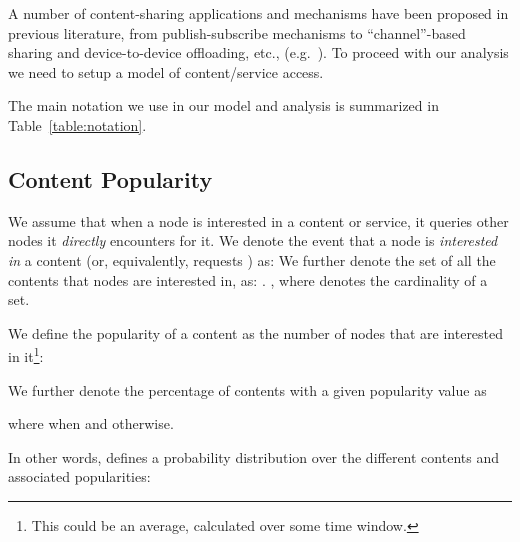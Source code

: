 \documentclass[journal]{IEEEtran}
\begin{document}
A number of content-sharing applications and mechanisms have been proposed in previous literature, from publish-subscribe mechanisms to ``channel''-based sharing and device-to-device offloading, etc., (e.g.~\cite{Yoneki-publish-subscribe-dtn,MobComp-next-decade,Ott-oppnet-applications,podcasting}). To proceed with our analysis we need to setup a model of content/service access. 

The main notation we use in our model and analysis is summarized in Table~\ref{table:notation}.

\subsection*{\textbf{Content Popularity}}

We assume that when a node is interested in a content or service, it queries other nodes it \textit{directly} encounters for it.  We denote the event that a node  is \textit{interested in} a content  (or, equivalently,  requests ) as:  We further denote the set of all the contents that nodes are interested in, as: . , where  denotes the cardinality of a set.
\begin{definition}\label{def:content-popularity}
We define the popularity of a content  as the number of nodes  that are interested in it\footnote{This could be an average, calculated over some time window.}: 

We further denote the percentage of contents with a given popularity value  as 

where  when  and  otherwise. 
\end{definition}

In other words,  defines a probability distribution over the different contents and associated popularities:  


\end{document}
